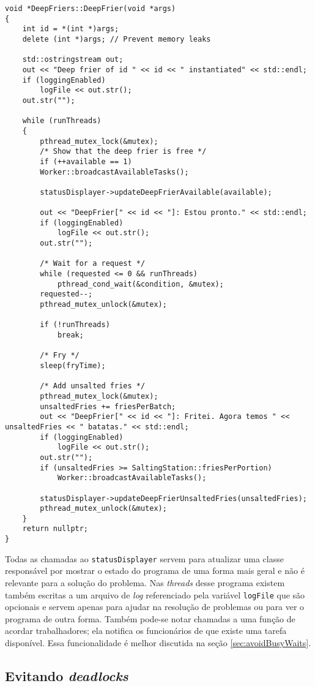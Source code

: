 \documentclass[a4paper]{article}
\begin{document}
\begin{lstlisting}[caption=\textit{Threads} das fritadeiras.\label{lst:deepFriersThread}]
void *DeepFriers::DeepFrier(void *args)
{
	int id = *(int *)args;
	delete (int *)args; // Prevent memory leaks
	
	std::ostringstream out;
	out << "Deep frier of id " << id << " instantiated" << std::endl;
	if (loggingEnabled)
		logFile << out.str();
	out.str("");
	
	while (runThreads)
	{
		pthread_mutex_lock(&mutex);
		/* Show that the deep frier is free */
		if (++available == 1)
		Worker::broadcastAvailableTasks();
		
		statusDisplayer->updateDeepFrierAvailable(available);
		
		out << "DeepFrier[" << id << "]: Estou pronto." << std::endl;
		if (loggingEnabled)
			logFile << out.str();
		out.str("");
		
		/* Wait for a request */
		while (requested <= 0 && runThreads)
			pthread_cond_wait(&condition, &mutex);
		requested--;
		pthread_mutex_unlock(&mutex);
		
		if (!runThreads)
			break;
		
		/* Fry */
		sleep(fryTime);
		
		/* Add unsalted fries */
		pthread_mutex_lock(&mutex);
		unsaltedFries += friesPerBatch;
		out << "DeepFrier[" << id << "]: Fritei. Agora temos " << unsaltedFries << " batatas." << std::endl;
		if (loggingEnabled)
			logFile << out.str();
		out.str("");
		if (unsaltedFries >= SaltingStation::friesPerPortion)
			Worker::broadcastAvailableTasks();
		
		statusDisplayer->updateDeepFrierUnsaltedFries(unsaltedFries);
		pthread_mutex_unlock(&mutex);
	}
	return nullptr;
}
\end{lstlisting}

Todas as chamadas ao \texttt{statusDisplayer} servem para atualizar uma classe responsável por mostrar o estado do programa de uma forma mais geral e não é relevante para a solução do problema. Nas \textit{threads} desse programa existem também escritas a um arquivo de \textit{log} referenciado pela variável \texttt{logFile} que são opcionais e servem apenas para ajudar na resolução de problemas ou para ver o programa de outra forma. Também pode-se notar chamadas a uma função de acordar trabalhadores; ela notifica os funcionários de que existe uma tarefa disponível. Essa funcionalidade é melhor discutida na seção \ref{sec:avoidBusyWaits}.

\subsection{Evitando \textit{deadlocks}}
\label{sec:avoidDeadlocks}
\end{document}
